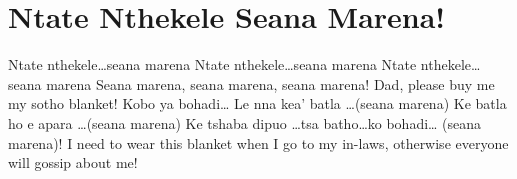 \starttocol
\chapter{Ntate Nthekele Seana Marena!}
\nexttocol
\hfill{\it }
\stoptocol
\starttocol
\startlines
{\sc Ntate} nthekele\dots seana marena
Ntate nthekele\dots seana marena
Ntate nthekele\dots seana marena
Seana marena, seana marena, seana marena!
\stoplines
\nexttocol
Dad, please buy me my sotho blanket!
\stoptocol
\starttocol
\startlines
Kobo ya bohadi\dots
Le nna kea' batla \dots(seana marena)
Ke batla ho e apara \dots(seana marena)
Ke tshaba dipuo \dots tsa batho\dots ko bohadi\dots  
 \hfill (seana marena)!
\stoplines
\nexttocol
I need to wear this blanket when I go to my in-laws, 
otherwise everyone will gossip about me!
\stoptocol
